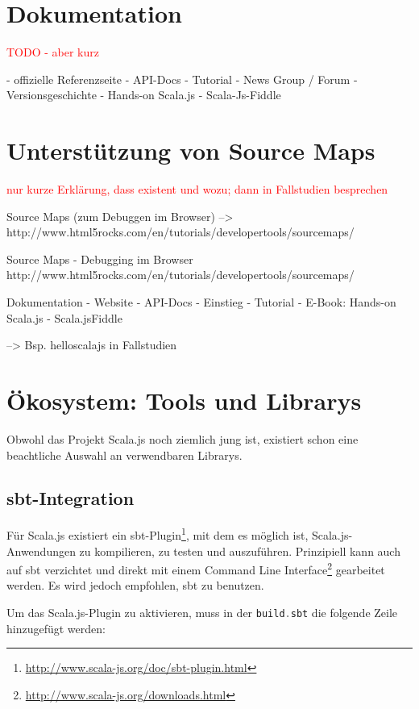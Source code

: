 \documentclass[a4paper, 12pt, hidelinks, listof=totoc, listoftables=totoc, bibliography=totoc]{scrreprt}
\newcommand{\code}[1]{\lstinline[language=Scala, style=inline]|#1|}
\newcommand{\TODO}[1]{\textcolor{red}{#1}\newline}
\begin{document}
\section{Dokumentation}

\TODO{TODO - aber kurz}

- offizielle Referenzseite
- \ac{API}-Docs
- Tutorial
- News Group / Forum
- Versionsgeschichte
- Hands-on Scala.js
- Scala-Js-Fiddle



\section{Unterstützung von Source Maps}

\TODO{nur kurze Erklärung, dass existent und wozu; dann in Fallstudien besprechen}

Source Maps (zum Debuggen im Browser)  -->  http://www.html5rocks.com/en/tutorials/developertools/sourcemaps/

Source Maps
  - Debugging im Browser
  http://www.html5rocks.com/en/tutorials/developertools/sourcemaps/

Dokumentation
  - Website
  - \ac{API}-Docs
  - Einstieg
    - Tutorial
    - E-Book: Hands-on Scala.js
    - Scala.jsFiddle

--> Bsp. helloscalajs in Fallstudien




\section{Ökosystem: Tools und Librarys}\label{sec:sjs-libs}

Obwohl das Projekt Scala.js noch ziemlich jung ist, existiert schon eine beachtliche Auswahl an verwendbaren Librarys. 


\subsection{sbt-Integration}\label{subsec:sjs-sbt}

Für Scala.js existiert ein sbt-Plugin\footnote{\url{http://www.scala-js.org/doc/sbt-plugin.html}}, mit dem es möglich ist, Scala.js-Anwendungen zu kompilieren, zu testen und auszuführen.
Prinzipiell kann auch auf sbt verzichtet und direkt mit einem Command Line Interface\footnote{\url{http://www.scala-js.org/downloads.html}} gearbeitet werden. Es wird jedoch empfohlen, sbt zu benutzen.

Um das Scala.js-Plugin zu aktivieren, muss in der \code{build.sbt} die folgende Zeile hinzugefügt werden:
\end{document}
